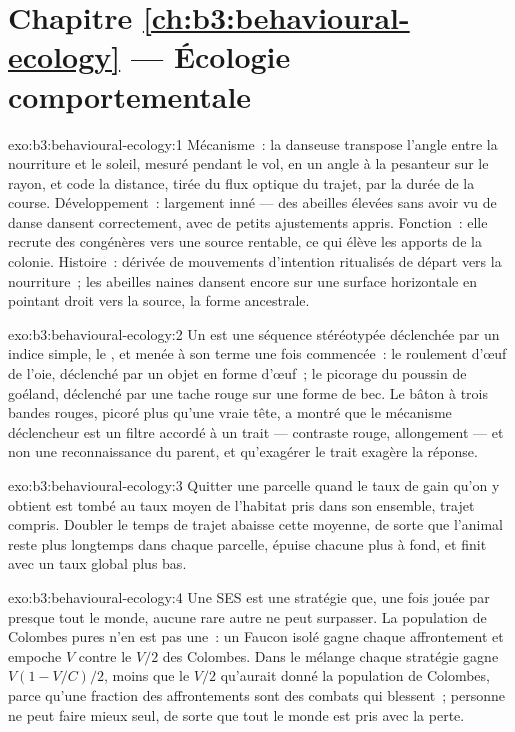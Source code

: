 \section*{Chapitre \ref{ch:b3:behavioural-ecology} --- Écologie comportementale}

\begin{solution}{exo:b3:behavioural-ecology:1}
Mécanisme~: la danseuse transpose l'angle entre la nourriture et le
soleil, mesuré pendant le vol, en un angle à la pesanteur sur le rayon,
et code la distance, tirée du flux optique du trajet, par la durée de la
course. Développement~: largement inné --- des abeilles élevées sans
avoir vu de danse dansent correctement, avec de petits ajustements
appris. Fonction~: elle recrute des congénères vers une source
rentable, ce qui élève les apports de la colonie. Histoire~: dérivée de
mouvements d'intention ritualisés de départ vers la nourriture~; les
abeilles naines dansent encore sur une surface horizontale en pointant
droit vers la source, la forme ancestrale.
\end{solution}

\begin{solution}{exo:b3:behavioural-ecology:2}
Un  est une séquence stéréotypée déclenchée par un
indice simple, le , et menée à son terme une fois
commencée~: le roulement d'œuf de l'oie, déclenché par un objet en forme
d'œuf~; le picorage du poussin de goéland, déclenché par une tache rouge
sur une forme de bec. Le bâton à trois bandes rouges, picoré plus qu'une
vraie tête, a montré que le mécanisme déclencheur est un filtre accordé
à un trait --- contraste rouge, allongement --- et non une
reconnaissance du parent, et qu'exagérer le trait exagère la réponse.
\end{solution}

\begin{solution}{exo:b3:behavioural-ecology:3}
Quitter une parcelle quand le taux de gain qu'on y obtient est tombé au
taux moyen de l'habitat pris dans son ensemble, trajet compris. Doubler
le temps de trajet abaisse cette moyenne, de sorte que l'animal reste
plus longtemps dans chaque parcelle, épuise chacune plus à fond, et
finit avec un taux global plus bas.
\end{solution}

\begin{solution}{exo:b3:behavioural-ecology:4}
Une SES est une stratégie que, une fois jouée par presque tout le monde,
aucune rare autre ne peut surpasser. La population de Colombes pures
n'en est pas une~: un Faucon isolé gagne chaque affrontement et empoche
$V$ contre le $V/2$ des Colombes. Dans le mélange chaque stratégie gagne
$V(1 - V/C)/2$, moins que le $V/2$ qu'aurait donné la population de
Colombes, parce qu'une fraction des affrontements sont des combats qui
blessent~; personne ne peut faire mieux seul, de sorte que tout le monde
est pris avec la perte.
\end{solution}

